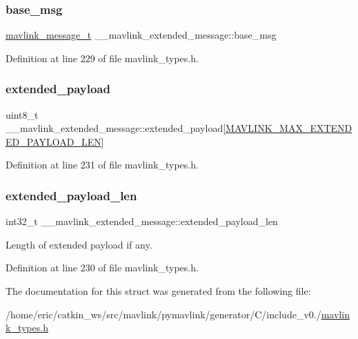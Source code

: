 \subsubsection{\texorpdfstring{base\_msg}{base\_msg}}
{\footnotesize\ttfamily \mbox{\hyperlink{include__v0_89_2mavlink__types_8h_a63b963764c09dc72f4910c1521e325b9}{mavlink\+\_\+message\+\_\+t}} \+\_\+\+\_\+mavlink\+\_\+extended\+\_\+message\+::base\+\_\+msg}



Definition at line 229 of file mavlink\+\_\+types.\+h.

\mbox{\label{struct____mavlink__extended__message_afccf6dc3341050b0a63ac0d069d66a31}} 
\subsubsection{\texorpdfstring{extended\_payload}{extended\_payload}}
{\footnotesize\ttfamily uint8\+\_\+t \+\_\+\+\_\+mavlink\+\_\+extended\+\_\+message\+::extended\+\_\+payload\mbox{[}\mbox{\hyperlink{include__v1_80_2mavlink__types_8h_a03fb68f36575eb133e3c046f55295837}{M\+A\+V\+L\+I\+N\+K\+\_\+\+M\+A\+X\+\_\+\+E\+X\+T\+E\+N\+D\+E\+D\+\_\+\+P\+A\+Y\+L\+O\+A\+D\+\_\+\+L\+EN}}\mbox{]}}



Definition at line 231 of file mavlink\+\_\+types.\+h.

\mbox{\label{struct____mavlink__extended__message_a7fcf54d2c29dc157a78caacae8d998cf}} 
\subsubsection{\texorpdfstring{extended\_payload\_len}{extended\_payload\_len}}
{\footnotesize\ttfamily int32\+\_\+t \+\_\+\+\_\+mavlink\+\_\+extended\+\_\+message\+::extended\+\_\+payload\+\_\+len}



Length of extended payload if any. 



Definition at line 230 of file mavlink\+\_\+types.\+h.



The documentation for this struct was generated from the following file\+:\begin{DoxyCompactItemize}
\item 
/home/eric/catkin\+\_\+ws/src/mavlink/pymavlink/generator/\+C/include\+\_\+v0./\mbox{\hyperlink{include__v0_89_2mavlink__types_8h}{mavlink\+\_\+types.\+h}}\end{DoxyCompactItemize}
